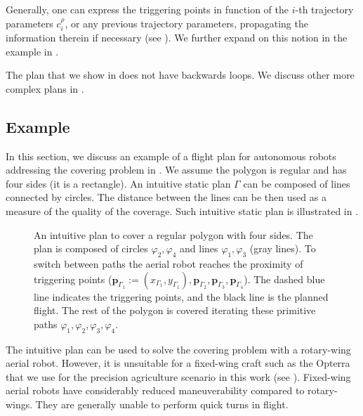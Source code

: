 Generally, one can express the triggering points in function of the $i$-th trajectory parameters $c_{i}^{\rho}$, or any previous trajectory parameters, propagating the information therein if necessary (see ). We further expand on this notion in the example in .

The plan that we show in  does not have backwards loops. We discuss other more complex plans in . 

\subsection{Example}
\label{sec:flight-plan}

In this section, we discuss an example of a flight plan for autonomous robots addressing the covering problem in . We assume the polygon is regular and has four sides (it is a rectangle). An intuitive static plan $\Gamma$ can be composed of lines connected by circles. The distance between the lines can be then used as a measure of the quality of the coverage. Such intuitive static plan is illustrated in .

\begin{figure}[t]
  \centering
  
  \caption[Intuitive plan to cover a regular polygon with four sides]{An intuitive plan to cover a regular polygon with four sides. The plan is composed of circles $\varphi_2,\varphi_4$ and lines $\varphi_1,\varphi_3$ (gray lines). To switch between paths the aerial robot reaches the proximity of triggering points ($\mathbf{p}_{\Gamma_1}:=(x_{\Gamma_1},y_{\Gamma_1}),\mathbf{p}_{\Gamma_2},\mathbf{p}_{\Gamma_3},\mathbf{p}_{\Gamma_4}$). The dashed blue line indicates the triggering points, and the black line is the planned flight. The rest of the polygon is covered iterating these primitive paths $\varphi_1,\varphi_2,\varphi_3,\varphi_4$.}
  \label{fig:plot3}
\end{figure}

The intuitive plan can be used to solve the covering problem with a rotary-wing aerial robot. However, it is unsuitable for a fixed-wing craft such as the Opterra that we use for the precision agriculture scenario in this work (see ). Fixed-wing aerial robots have considerably reduced maneuverability compared to rotary-wings. They are generally unable to perform quick turns in flight.

